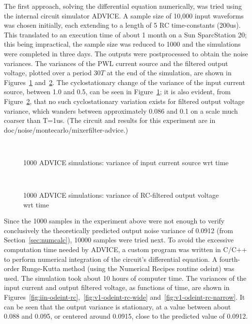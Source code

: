 \documentclass[9pt,times]{article}
\begin{document}
The first approach, solving the differential equation numerically, was tried
using the internal circuit simulator ADVICE. A sample size of 10,000 input
waveforms was chosen initially, each extending to a length of 5 RC
time-constants (200us). This translated to an execution time of
about 1 month on a Sun SparcStation 20; this being impractical, the sample
size was reduced to 1000 and the simulations were completed in three days.
The outputs were postprocessed to obtain the noise variances. The variances
of the PWL current source and the filtered output voltage, plotted over a
period $30T$ at the end of the simulation, are shown in
Figures~\ref{fig:iin-rc-advice} and~\ref{fig:v1-rc-advice}. The
cyclostationary change of the variance of the input current source, between
1.0 and 0.5, can be seen in Figure~\ref{fig:iin-rc-advice}; it
is also evident, from Figure~\ref{fig:v1-rc-advice}, that no such
cyclostationary variation exists for filtered output voltage variance, which
wanders between approximately 0.086 and 0.1 on a scale much coarser than
T=1us.  (The circuit and results for this experiment are in
{\sf doc/noise/montecarlo/mixerfilter-advice}.)

\begin{figure}[htbp]
\centerline{\ }
\caption{1000 ADVICE simulations: variance of input current source wrt time}
\label{fig:iin-rc-advice}
\end{figure}
\begin{figure}[htbp]
\centerline{\ }
\caption{1000 ADVICE simulations: variance of RC-filtered output voltage wrt time}
\label{fig:v1-rc-advice}
\end{figure}

Since the 1000 samples in the experiment above were not enough to verify
conclusively the theoretically predicted output noise variance of 0.0912
(from Section~\ref{sec:numcalc}), 10000 samples were tried next. To avoid
the excessive computation time needed by ADVICE, a custom program was
written in C/C++ to perform numerical integration of the circuit's
differential equation. A fourth-order Runge-Kutta method (using the
Numerical Recipes routine {\sf odeint}) was used. The simulation took about
10 hours of computer time. The variances of the input current and output
filtered voltage, as functions of time, are shown in
Figures~\ref{fig:iin-odeint-rc},~\ref{fig:v1-odeint-rc-wide}
and~\ref{fig:v1-odeint-rc-narrow}. It can be seen that the output variance
is stationary, at a value between about 0.088 and 0.095, or centered around
0.0915, close to the predicted value of 0.0912.
\end{document}

